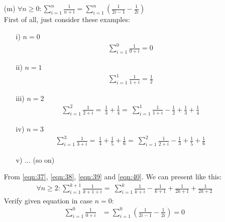 \begin{enumerate}
    \newpage
    \item[(m)] $\forall n\geq 0: \displaystyle\sum^{n}_{i=1} \frac{1}{n+i} = \displaystyle\sum^{n}_{i=1} (\frac{1}{2i-1}-\frac{1}{2i})$ \\
    First of all, just consider these examples:
        \begin{enumerate}
            \item [i)] $n=0$
                \begin{align}
                    \displaystyle\sum^{0}_{i=1} \frac{1}{0+i} = 0 \label{eqn:37}
                \end{align}
            \item [ii)] $n=1$
                \begin{align}
                    \displaystyle\sum^{1}_{i=1} \frac{1}{1+i} = \frac{1}{2} \label{eqn:38}
                \end{align}
            \item [iii)] $n=2$
                \begin{align}
                    \displaystyle\sum^{2}_{i=1} \frac{1}{2+i} =\ 
                    \frac{1}{3}+\frac{1}{4} =\ 
                    \displaystyle\sum^{1}_{i=1} \frac{1}{1+i} -\frac{1}{2}+\frac{1}{3}+\frac{1}{4} \label{eqn:39}
                \end{align}
            \item [iv)] $n=3$
                \begin{align}
                    \displaystyle\sum^{3}_{i=1} \frac{1}{3+i} =\
                    \frac{1}{4}+\frac{1}{5} +\frac{1}{6} =\ 
                    \displaystyle\sum^{2}_{i=1} \frac{1}{2+i} -\frac{1}{3}+\frac{1}{5}+\frac{1}{6} \label{eqn:40}
                \end{align}
            \item[v)] ... (so on)
        \end{enumerate}
    From \ref{eqn:37}, \ref{eqn:38}, \ref{eqn:39} and \ref{eqn:40}. We can present like this:
    \begin{align}
        \forall n\geq 2: \displaystyle\sum^{k+1}_{i=1} \frac{1}{k+1+i} =\
        \displaystyle\sum^{k}_{i=1} \frac{1}{k+i} -\frac{1}{k+1}+\frac{1}{2k+1}+\frac{1}{2k+2} \label{eqn:40}
    \end{align}
    Verify given equation in case $n=0$:
        \begin{align}
            \displaystyle\sum^{0}_{i=1} \frac{1}{0+i} &= \displaystyle\sum^{0}_{i=1} (\frac{1}{2i-1}-\frac{1}{2i}) = 0 \label{eqn:41}
        \end{align}

\end{enumerate}
